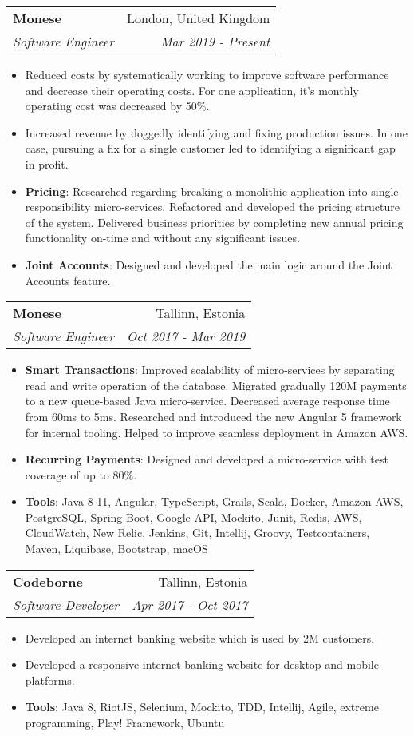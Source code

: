 \documentclass[letterpaper,11pt]{article}
\makeatletter
\newcommand{\resumeItem}[2]{
  \item\small{
    \textbf{#1}{: #2 \vspace{-2pt}}
  }
}
\newcommand{\resumeItemWithoutTitle}[2]{
  \item\small{
    \textbf{#1}{#2\vspace{-2pt}}
  }
}
\newcommand{\resumeSubheading}[4]{
  \vspace{-1pt}\item
    \begin{tabular*}{0.97\textwidth}[t]{l@{\extracolsep{\fill}}r}
      \textbf{#1} & #2 \\
      \textit{\small#3} & \textit{\small #4} \\
    \end{tabular*}\vspace{-5pt}
}
\newcommand{\resumeSubSubheading}[2]{
    \begin{tabular*}{0.97\textwidth}{l@{\extracolsep{\fill}}r}
      \textit{\small#1} & \textit{\small #2} \\
    \end{tabular*}\vspace{-5pt}
}
\newcommand{\resumeItemListStart}{\begin{itemize}}
\newcommand{\resumeItemListEnd}{\end{itemize}\vspace{-5pt}}
\makeatother
\begin{document}
    \resumeSubheading
      {Monese}{London, United Kingdom}
      {Software Engineer}{Mar 2019 - Present}
      \resumeItemListStart
        \resumeItemWithoutTitle{}
        {Reduced costs by systematically working to improve software performance and decrease their 
        operating costs. For one application, it’s monthly operating cost was decreased by 50\%.}
        \resumeItemWithoutTitle{}
        {Increased revenue by doggedly identifying and fixing production issues. In one case, 
        pursuing a fix for a single customer led to identifying a significant gap in profit.}
        \resumeItem{Pricing}
        {Researched regarding breaking a monolithic application into single responsibility micro-services. Refactored and
        developed the pricing structure of the system. Delivered business priorities by completing 
        new annual pricing functionality on-time and without any significant issues.}
        \resumeItem{Joint Accounts}
        {Designed and developed the main logic around the Joint Accounts feature.}
      \resumeItemListEnd

  \resumeSubheading
  {Monese}{Tallinn, Estonia}
  {Software Engineer}{Oct 2017 - Mar 2019}
  \resumeItemListStart
    \resumeItem{Smart Transactions}
      {Improved scalability of micro-services by separating read and write operation of the database. 
      Migrated gradually 120M payments to a new queue-based Java micro-service. Decreased average response
      time from 60ms to 5ms. Researched and introduced the new Angular 5 framework for internal tooling. 
      Helped to improve seamless deployment in Amazon AWS.}
    \resumeItem{Recurring Payments}
      {Designed and developed a micro-service with test coverage of up to 80\%.}
    \resumeItem{Tools}
      {Java 8-11, Angular, TypeScript, Grails, Scala, Docker, Amazon AWS, PostgreSQL, Spring Boot, 
      Google API, Mockito, Junit, Redis, AWS, CloudWatch, New Relic, Jenkins, Git, Intellij, Groovy, 
      Testcontainers, Maven, Liquibase, Bootstrap, macOS}
  \resumeItemListEnd
    \resumeSubheading
      {Codeborne}{Tallinn, Estonia}
      {Software Developer}{Apr 2017 - Oct 2017}
      \resumeItemListStart
        \resumeItemWithoutTitle{}
          {Developed an internet banking website which is used by 2M customers.}
        \resumeItemWithoutTitle{}
          {Developed a responsive internet banking website for desktop and mobile platforms.}
        \resumeItem{Tools}
        {Java 8, RiotJS, Selenium, Mockito, TDD, Intellij, Agile, extreme programming, Play! Framework, 
        Ubuntu}
      \resumeItemListEnd
\end{document}
